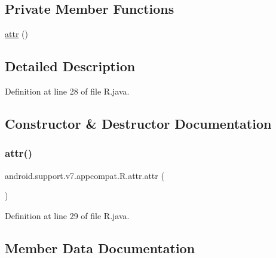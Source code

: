 \subsection*{Private Member Functions}
\begin{DoxyCompactItemize}
\item 
\mbox{\hyperlink{classandroid_1_1support_1_1v7_1_1appcompat_1_1_r_1_1attr_a53df3eeb506dd17fd58e85434afbe54d}{attr}} ()
\end{DoxyCompactItemize}


\subsection{Detailed Description}


Definition at line 28 of file R.\+java.



\subsection{Constructor \& Destructor Documentation}
\mbox{\label{classandroid_1_1support_1_1v7_1_1appcompat_1_1_r_1_1attr_a53df3eeb506dd17fd58e85434afbe54d}} 
\subsubsection{\texorpdfstring{attr()}{attr()}}
{\footnotesize\ttfamily android.\+support.\+v7.\+appcompat.\+R.\+attr.\+attr (\begin{DoxyParamCaption}{ }\end{DoxyParamCaption})\hspace{0.3cm}{\ttfamily [private]}}



Definition at line 29 of file R.\+java.


\begin{DoxyCode}{0}

\end{DoxyCode}


\subsection{Member Data Documentation}
\mbox{\label{classandroid_1_1support_1_1v7_1_1appcompat_1_1_r_1_1attr_ac6a2c7ce44a2166d7e14504e8190c672}} 
